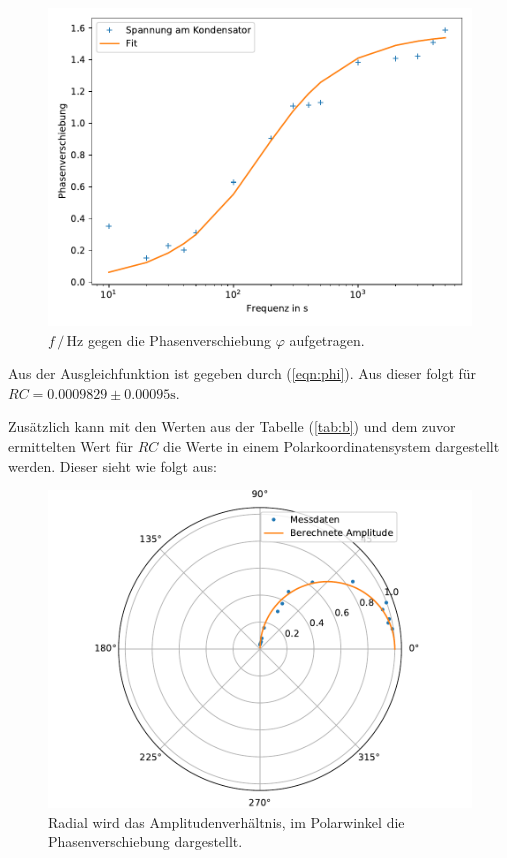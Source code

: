     \begin{figure}
        \centering
        \includegraphics[width=\textwidth]{Daten/c.pdf}
        \caption{$f \, / \, \si{\hertz}$ gegen die Phasenverschiebung $\varphi$ aufgetragen.}
    \end{figure}
    
    Aus der Ausgleichfunktion ist gegeben durch (\ref{eqn:phi}). Aus dieser folgt für $RC = 0.0009829 \pm 0.00095 \si{\second}$.

    Zusätzlich kann mit den Werten aus der Tabelle (\ref{tab:b}) und dem zuvor ermittelten Wert für $RC$ die Werte in einem Polarkoordinatensystem dargestellt werden. Dieser sieht wie folgt aus:

    \begin{figure}
        \centering
        \includegraphics[width=\textwidth]{Daten/d.pdf}
        \caption{Radial wird das Amplitudenverhältnis, im Polarwinkel die Phasenverschiebung dargestellt.}
    \end{figure}
\newpage
